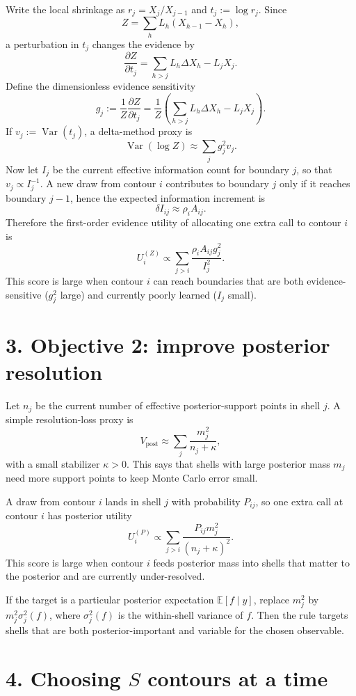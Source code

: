 \documentclass[10pt]{article}
\begin{document}
Write the local shrinkage as $r_j=X_j/X_{j-1}$ and $t_j:=\log r_j$. Since
\[
Z=\sum_h L_h(X_{h-1}-X_h),
\]
a perturbation in $t_j$ changes the evidence by
\[
\frac{\partial Z}{\partial t_j}
=\sum_{h>j} L_h\Delta X_h - L_jX_j.
\]
Define the dimensionless evidence sensitivity
\[
g_j:=\frac{1}{Z}\frac{\partial Z}{\partial t_j}
=\frac{1}{Z}\left(\sum_{h>j}L_h\Delta X_h-L_jX_j\right).
\]
If $v_j:=\operatorname{Var}(t_j)$, a delta-method proxy is
\[
\operatorname{Var}(\log Z)\approx \sum_j g_j^2v_j.
\]
Now let $I_j$ be the current effective information count for boundary $j$, so that $v_j\propto I_j^{-1}$. A new draw from contour $i$ contributes to boundary $j$ only if it reaches boundary $j-1$, hence the expected information increment is
\[
\delta I_{ij}\approx \rho_iA_{ij}.
\]
Therefore the first-order evidence utility of allocating one extra call to contour $i$ is
\[
\boxed{
U_i^{(Z)}
\propto
\sum_{j>i}
\frac{\rho_iA_{ij}g_j^2}{I_j^2}.
}
\]
This score is large when contour $i$ can reach boundaries that are both evidence-sensitive ($g_j^2$ large) and currently poorly learned ($I_j$ small).

\section*{3. Objective 2: improve posterior resolution}

Let $n_j$ be the current number of effective posterior-support points in shell $j$. A simple resolution-loss proxy is
\[
V_{\mathrm{post}}\approx \sum_j \frac{m_j^2}{n_j+\kappa},
\]
with a small stabilizer $\kappa>0$. This says that shells with large posterior mass $m_j$ need more support points to keep Monte Carlo error small.

A draw from contour $i$ lands in shell $j$ with probability $P_{ij}$, so one extra call at contour $i$ has posterior utility
\[
\boxed{
U_i^{(P)}
\propto
\sum_{j>i}
\frac{P_{ij}m_j^2}{(n_j+\kappa)^2}.
}
\]
This score is large when contour $i$ feeds posterior mass into shells that matter to the posterior and are currently under-resolved.

If the target is a particular posterior expectation $\mathbb{E}[f\mid y]$, replace $m_j^2$ by $m_j^2\sigma_j^2(f)$, where $\sigma_j^2(f)$ is the within-shell variance of $f$. Then the rule targets shells that are both posterior-important and variable for the chosen observable.

\section*{4. Choosing $S$ contours at a time}
\end{document}
